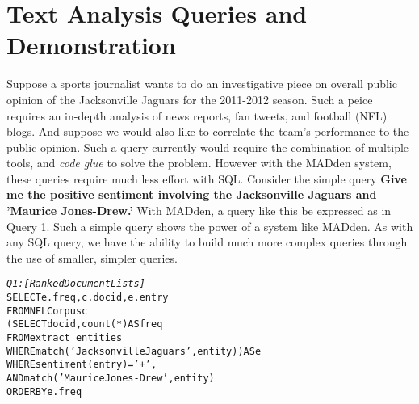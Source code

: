 \section{Text Analysis Queries and Demonstration}
Suppose a sports journalist wants to do an investigative
piece on overall public opinion of the Jacksonville Jaguars
for the 2011-2012 season.
Such a peice requires an in-depth analysis of news reports, fan tweets, and 
football (NFL) blogs. And suppose we would also like to correlate the team's
performance to the public opinion. Such a query currently would require
the combination of multiple tools, and \textit{code glue} to solve the problem.
However with the MADden system, these queries require much less effort with SQL.
Consider the simple query \textbf{Give me the positive sentiment involving the
Jacksonville Jaguars and 'Maurice Jones-Drew.'} With MADden, a query like
this be expressed as in Query 1. Such a simple query shows the power of a 
system like MADden. As with any SQL query, we have the ability to build much 
more complex queries through the use of smaller, simpler queries.

\begin{small}
\begin{alltt}
\textit{Q1: [Ranked Document Lists]}
SELECT e.freq, c.docid,  e.entry
FROM NFLCorpus c
    (SELECT docid, count(*) AS freq
    FROM extract_entities
    WHERE match('Jacksonville Jaguars', entity)) AS e
WHERE sentiment(entry) = '+',
AND match('Maurice Jones-Drew', entity)
ORDER BY e.freq
\end{alltt}
\end{small}
\label{}

